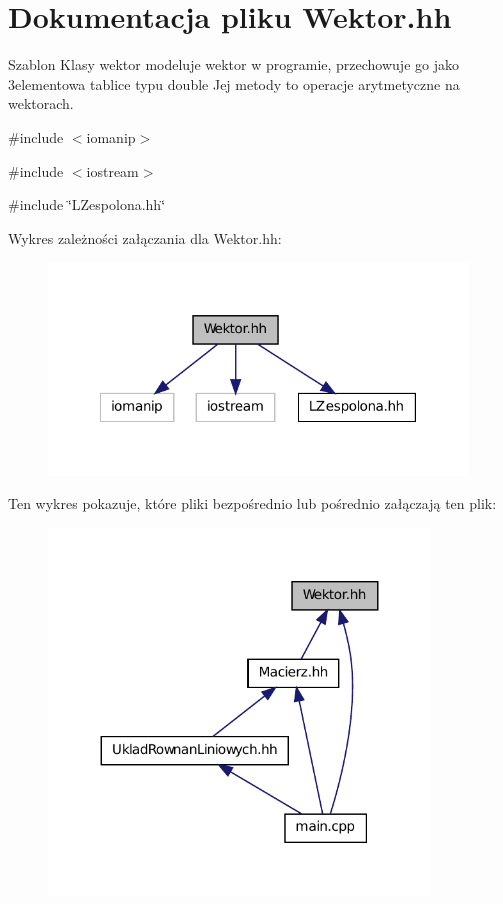 \hypertarget{_wektor_8hh}{
\section{Dokumentacja pliku Wektor.hh}
\label{_wektor_8hh}
}


Szablon Klasy wektor modeluje wektor w programie, przechowuje go jako 3elementowa tablice typu double Jej metody to operacje arytmetyczne na wektorach.  


{\ttfamily \#include $<$iomanip$>$}\par
{\ttfamily \#include $<$iostream$>$}\par
{\ttfamily \#include \char`\"{}LZespolona.hh\char`\"{}}\par
Wykres zależności załączania dla Wektor.hh:\nopagebreak
\begin{figure}[H]
\begin{center}
\leavevmode
\includegraphics[width=316pt]{_wektor_8hh__incl}
\end{center}
\end{figure}
Ten wykres pokazuje, które pliki bezpośrednio lub pośrednio załączają ten plik:\nopagebreak
\begin{figure}[H]
\begin{center}
\leavevmode
\includegraphics[width=287pt]{_wektor_8hh__dep__incl}
\end{center}
\end{figure}
